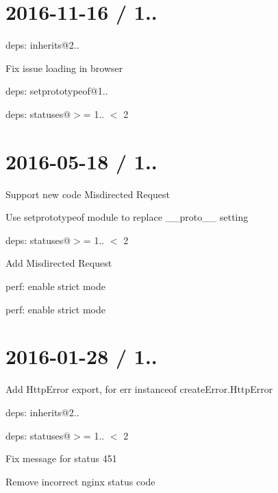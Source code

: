\section*{2016-\/11-\/16 / 1.. }


\begin{DoxyItemize}
\item deps\+: inherits@2..
\begin{DoxyItemize}
\item Fix issue loading in browser
\end{DoxyItemize}
\item deps\+: setprototypeof@1..
\item deps\+: statuses@\textquotesingle{}$>$= 1.. $<$ 2\textquotesingle{}
\end{DoxyItemize}

\section*{2016-\/05-\/18 / 1.. }


\begin{DoxyItemize}
\item Support new code { Misdirected Request}
\item Use {\ttfamily setprototypeof} module to replace {\ttfamily \+\_\+\+\_\+proto\+\_\+\+\_\+} setting
\item deps\+: statuses@\textquotesingle{}$>$= 1.. $<$ 2\textquotesingle{}
\begin{DoxyItemize}
\item Add { Misdirected Request}
\item perf\+: enable strict mode
\end{DoxyItemize}
\item perf\+: enable strict mode
\end{DoxyItemize}

\section*{2016-\/01-\/28 / 1.. }


\begin{DoxyItemize}
\item Add {\ttfamily Http\+Error} export, for {\ttfamily err instanceof create\+Error.\+Http\+Error}
\item deps\+: inherits@2..
\item deps\+: statuses@\textquotesingle{}$>$= 1.. $<$ 2\textquotesingle{}
\begin{DoxyItemize}
\item Fix message for status 451
\item Remove incorrect nginx status code
\end{DoxyItemize}
\end{DoxyItemize}

